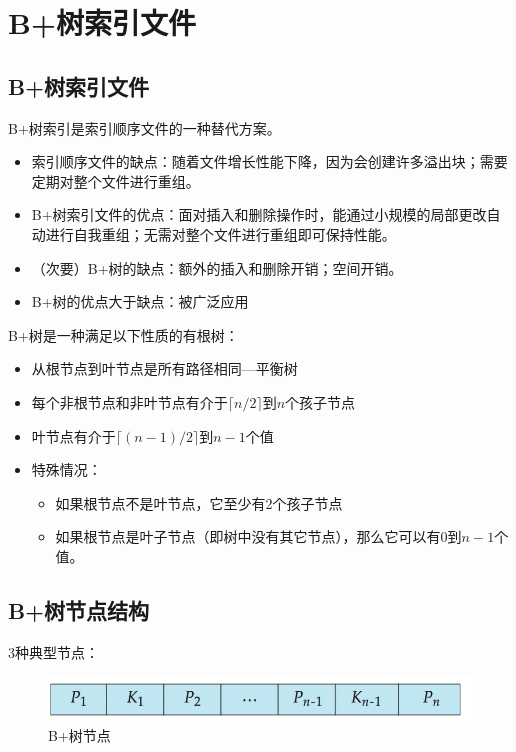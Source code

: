 \section{B+树索引文件}

\subsection{B+树索引文件}

B+树索引是索引顺序文件的一种替代方案。

\begin{itemize}
    \item 索引顺序文件的缺点：随着文件增长性能下降，因为会创建许多溢出块；需要定期对整个文件进行重组。
    \item B+树索引文件的优点：面对插入和删除操作时，能通过小规模的局部更改自动进行自我重组；无需对整个文件进行重组即可保持性能。
    \item （次要）B+树的缺点：额外的插入和删除开销；空间开销。
    \item B+树的优点大于缺点：被广泛应用
\end{itemize}

B+树是一种满足以下性质的有根树：

\begin{itemize}
    \item 从根节点到叶节点是所有路径相同---平衡树
    \item 每个非根节点和非叶节点有介于$\lceil n/2 \rceil$到$n$个孩子节点
    \item 叶节点有介于$\lceil (n-1)/2 \rceil$到$n-1$个值
    \item 特殊情况：
       \begin{itemize}
           \item 如果根节点不是叶节点，它至少有2个孩子节点
           \item 如果根节点是叶子节点（即树中没有其它节点），那么它可以有0到$n-1$个值。
       \end{itemize}
\end{itemize}

\subsection{B+树节点结构}

3种典型节点：

\begin{figure}[H]
    \centering
    \includegraphics[width=0.9\linewidth]{image5.png}
    \caption{B+树节点}
    \label{}
\end{figure}

